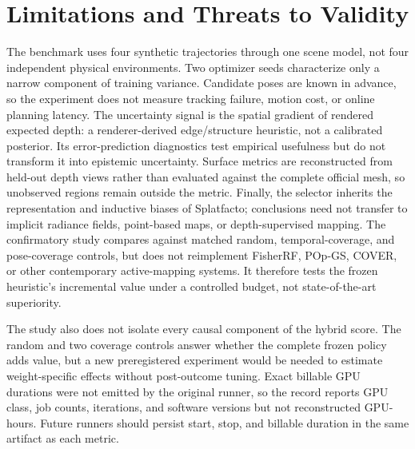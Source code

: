 \section{Limitations and Threats to Validity}

The benchmark uses four synthetic trajectories through one scene model, not
four independent physical environments.  Two optimizer seeds characterize only
a narrow component of training variance.  Candidate poses are known in advance,
so the experiment does not measure tracking failure, motion cost, or online
planning latency.  The uncertainty signal is the spatial gradient of rendered
expected depth: a renderer-derived edge/structure heuristic, not a calibrated
posterior.  Its error-prediction diagnostics test empirical usefulness but do
not transform it into epistemic uncertainty.  Surface metrics are reconstructed
from held-out depth views rather than evaluated against the complete official
mesh, so unobserved
regions remain outside the metric.  Finally, the selector inherits the
representation and inductive biases of Splatfacto; conclusions need not transfer
to implicit radiance fields, point-based maps, or depth-supervised mapping.  The
confirmatory study compares against matched random, temporal-coverage, and
pose-coverage controls, but does not reimplement FisherRF, POp-GS, COVER, or
other contemporary active-mapping systems.  It therefore tests the frozen
heuristic's incremental value under a controlled budget, not state-of-the-art
superiority.

The study also does not isolate every causal component of the hybrid score.
The random and two coverage controls answer whether the complete frozen policy
adds value, but a new preregistered experiment would be needed to estimate
weight-specific effects without post-outcome tuning.  Exact billable GPU
durations were not emitted by the original runner, so the record reports GPU
class, job counts, iterations, and software versions but not reconstructed
GPU-hours.  Future runners should persist start, stop, and billable duration in
the same artifact as each metric.
